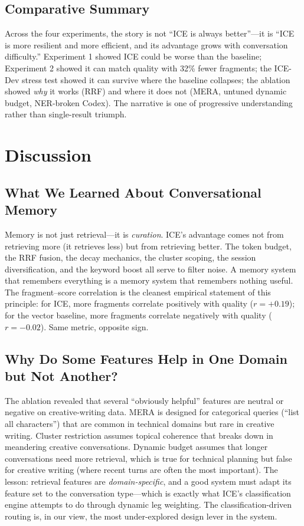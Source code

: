 \documentclass[10pt]{article}
\begin{document}
\subsection{Comparative Summary}

Across the four experiments, the story is not ``ICE is always better''---it is ``ICE is more resilient and more efficient, and its advantage grows with conversation difficulty.'' Experiment 1 showed ICE could be worse than the baseline; Experiment 2 showed it can match quality with 32\% fewer fragments; the ICE-Dev stress test showed it can survive where the baseline collapses; the ablation showed \emph{why} it works (RRF) and where it does not (MERA, untuned dynamic budget, NER-broken Codex). The narrative is one of progressive understanding rather than single-result triumph.

\section{Discussion}
\label{sec:discussion}

\subsection{What We Learned About Conversational Memory}

Memory is not just retrieval---it is \emph{curation}. ICE's advantage comes not from retrieving more (it retrieves less) but from retrieving better. The token budget, the RRF fusion, the decay mechanics, the cluster scoping, the session diversification, and the keyword boost all serve to filter noise. A memory system that remembers everything is a memory system that remembers nothing useful. The fragment--score correlation is the cleanest empirical statement of this principle: for ICE, more fragments correlate positively with quality ($r = +0.19$); for the vector baseline, more fragments correlate negatively with quality ($r = -0.02$). Same metric, opposite sign.

\subsection{Why Do Some Features Help in One Domain but Not Another?}

The ablation revealed that several ``obviously helpful'' features are neutral or negative on creative-writing data. MERA is designed for categorical queries (``list all characters'') that are common in technical domains but rare in creative writing. Cluster restriction assumes topical coherence that breaks down in meandering creative conversations. Dynamic budget assumes that longer conversations need more retrieval, which is true for technical planning but false for creative writing (where recent turns are often the most important). The lesson: retrieval features are \emph{domain-specific}, and a good system must adapt its feature set to the conversation type---which is exactly what ICE's classification engine attempts to do through dynamic leg weighting. The classification-driven routing is, in our view, the most under-explored design lever in the system.
\end{document}
